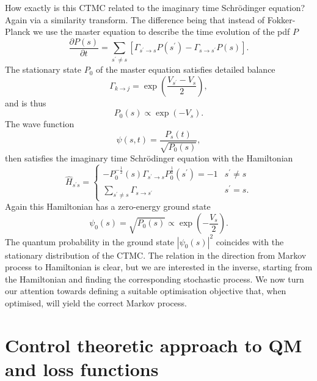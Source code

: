 How exactly is this CTMC related to the imaginary time Schr\" odinger equation? Again via a similarity transform. The difference being that instead of Fokker-Planck we use the master equation to describe the time evolution of the pdf $P$
\begin{equation}
\frac{\partial P(s)}{\partial t}=\sum_{s^\prime \neq s}\left[\Gamma_{s^\prime \rightarrow s} P(s^\prime)-\Gamma_{s \rightarrow s^\prime} P(s)\right].
\end{equation}
The stationary state $P_0$ of the master equation satisfies detailed balance
\begin{equation}
	\Gamma_{k \rightarrow j}=\exp \left(\frac{V_{s^\prime}-V_{s}}{2}\right),
\end{equation}
and is thus
\begin{equation}
	P_{0}(s) \propto \exp \left(-V_{s}\right).
\end{equation}
The wave function 
\begin{equation}
	\psi(s, t)=\frac{P_{s}(t)}{\sqrt{P_{0}(s)}},
\end{equation}
then satisfies the imaginary time Schr\" odinger equation with the Hamiltonian
\begin{equation}
	\hat H_{s^\prime s}=\left\{\begin{array}{ll}
	-P_{0}^{-\frac{1}{2}}(s) \Gamma_{s^\prime \rightarrow s} P_{0}^{\frac{1}{2}}(s^\prime)=-1 & s^\prime \neq s \\
	\sum_{s^\prime \neq s} \Gamma_{s \rightarrow s^\prime} & s^\prime=s.
	\end{array}\right. 
\end{equation}
Again this Hamiltonian has a zero-energy ground state 
\begin{equation}
	\psi_{0}(s)=\sqrt{P_{0}(s)} \propto \exp \left(-\frac{V_{s}}{2}\right).
\end{equation}
The quantum probability in the ground state $|\psi_0(s)|^2$ coincides with the stationary distribution of the CTMC. The relation in the direction from Markov process to Hamiltonian is clear, but we are interested in the inverse, starting from the Hamiltonian and finding the corresponding stochastic process. We now turn our attention towards defining a suitable optimisation objective that, when optimised, will yield the correct Markov process.

\section{Control theoretic approach to QM and loss functions}
\label{sec:control_loss}
